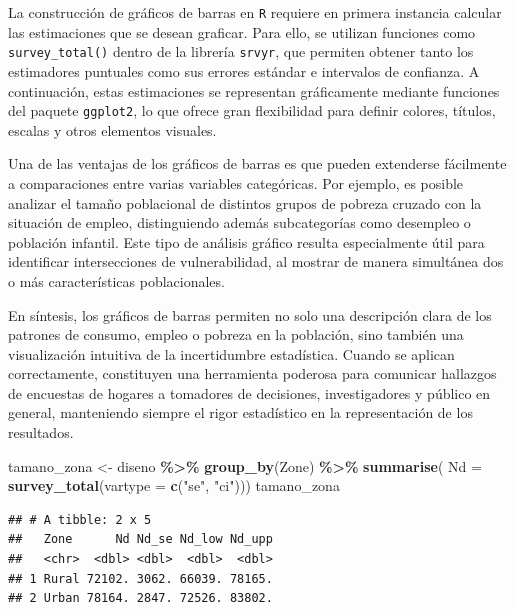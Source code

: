 \documentclass[
  spanish,
  12pt,
]{book}
\newenvironment{Shaded}{\begin{snugshade}}{\end{snugshade}}
\newcommand{\AttributeTok}[1]{\textcolor[rgb]{0.13,0.29,0.53}{#1}}
\newcommand{\FunctionTok}[1]{\textcolor[rgb]{0.13,0.29,0.53}{\textbf{#1}}}
\newcommand{\NormalTok}[1]{#1}
\newcommand{\OtherTok}[1]{\textcolor[rgb]{0.56,0.35,0.01}{#1}}
\newcommand{\SpecialCharTok}[1]{\textcolor[rgb]{0.81,0.36,0.00}{\textbf{#1}}}
\newcommand{\StringTok}[1]{\textcolor[rgb]{0.31,0.60,0.02}{#1}}
\begin{document}
La construcción de gráficos de barras en \texttt{R} requiere en primera instancia calcular las estimaciones que se desean graficar. Para ello, se utilizan funciones como \texttt{survey\_total()} dentro de la librería \texttt{srvyr}, que permiten obtener tanto los estimadores puntuales como sus errores estándar e intervalos de confianza. A continuación, estas estimaciones se representan gráficamente mediante funciones del paquete \texttt{ggplot2}, lo que ofrece gran flexibilidad para definir colores, títulos, escalas y otros elementos visuales.

Una de las ventajas de los gráficos de barras es que pueden extenderse fácilmente a comparaciones entre varias variables categóricas. Por ejemplo, es posible analizar el tamaño poblacional de distintos grupos de pobreza cruzado con la situación de empleo, distinguiendo además subcategorías como desempleo o población infantil. Este tipo de análisis gráfico resulta especialmente útil para identificar intersecciones de vulnerabilidad, al mostrar de manera simultánea dos o más características poblacionales.

En síntesis, los gráficos de barras permiten no solo una descripción clara de los patrones de consumo, empleo o pobreza en la población, sino también una visualización intuitiva de la incertidumbre estadística. Cuando se aplican correctamente, constituyen una herramienta poderosa para comunicar hallazgos de encuestas de hogares a tomadores de decisiones, investigadores y público en general, manteniendo siempre el rigor estadístico en la representación de los resultados.

\begin{Shaded}
\begin{Highlighting}[]
\NormalTok{tamano\_zona }\OtherTok{\textless{}{-}}\NormalTok{ diseno }\SpecialCharTok{\%\textgreater{}\%}
  \FunctionTok{group\_by}\NormalTok{(Zone) }\SpecialCharTok{\%\textgreater{}\%}
  \FunctionTok{summarise}\NormalTok{( }\AttributeTok{Nd =} \FunctionTok{survey\_total}\NormalTok{(}\AttributeTok{vartype =} \FunctionTok{c}\NormalTok{(}\StringTok{"se"}\NormalTok{, }\StringTok{"ci"}\NormalTok{)))}
\NormalTok{tamano\_zona }
\end{Highlighting}
\end{Shaded}

\begin{verbatim}
## # A tibble: 2 x 5
##   Zone      Nd Nd_se Nd_low Nd_upp
##   <chr>  <dbl> <dbl>  <dbl>  <dbl>
## 1 Rural 72102. 3062. 66039. 78165.
## 2 Urban 78164. 2847. 72526. 83802.
\end{verbatim}
\end{document}
